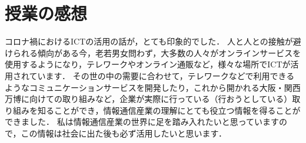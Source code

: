 \section*{授業の感想}
コロナ禍におけるICTの活用の話が，とても印象的でした．
人と人との接触が避けられる傾向がある今，老若男女問わず，大多数の人々がオンラインサービスを使用するようになり，テレワークやオンライン通販など，様々な場所でICTが活用されています．
その世の中の需要に合わせて，テレワークなどで利用できるようなコミュニケーションサービスを開発したり，これから開かれる大阪・関西万博に向けての取り組みなど，企業が実際に行っている（行おうとしている）取り組みを知ることができ，情報通信産業の理解にとても役立つ情報を得ることができました．
私は情報通信産業の世界に足を踏み入れたいと思っていますので，この情報は社会に出た後も必ず活用したいと思います．
